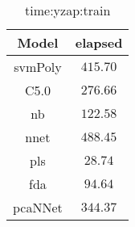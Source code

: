 \begin{table}[!ht]
	\centering
	\begin{tabular}{|c|c|}
		\hline
		Model & elapsed \\ \hline
		svmPoly & $415.70$ \\ \hline
		C5.0 & $276.66$ \\ \hline
		nb & $122.58$ \\ \hline
		nnet & $488.45$ \\ \hline
		pls & $28.74$ \\ \hline
		fda & $94.64$ \\ \hline
		pcaNNet & $344.37$ \\ \hline
	\end{tabular}
	\caption{time:yzap:train}
	\label{tab:time:yzap:train}
\end{table}

